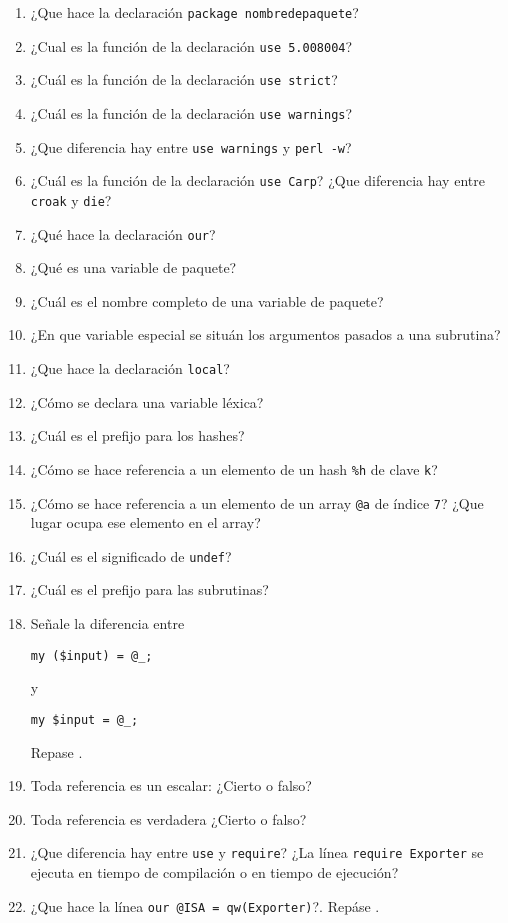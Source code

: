\label{repaso:fases}
\begin{enumerate}
\item
¿Que hace la declaración 
\verb|package nombredepaquete|?
\item
¿Cual es la función de la declaración \verb|use 5.008004|?
\item
¿Cuál es la función de la declaración \verb|use strict|?
\item
¿Cuál es la función de la declaración \verb|use warnings|?
\item
¿Que diferencia hay entre \verb|use warnings| y \verb|perl -w|?
\item
¿Cuál es la función de la declaración \verb|use Carp|?
¿Que diferencia hay entre \verb|croak| y \verb|die|?
\item
¿Qué hace la declaración \verb|our|? 
\item
¿Qué es una variable de paquete?
\item
¿Cuál es el nombre completo de una variable de paquete?
\item
¿En que variable especial se situán los argumentos pasados a una subrutina?
\item
¿Que hace la declaración \verb|local|?
\item
¿Cómo se declara una variable léxica?
\item
¿Cuál es el prefijo para los hashes?
\item
¿Cómo se hace referencia a un elemento de un hash \verb|%h| de clave \verb|k|?
\item
¿Cómo se hace referencia a un elemento de un array \verb|@a| de índice \verb|7|?
¿Que lugar ocupa ese elemento en el array?
\item
¿Cuál es el significado de \verb|undef|?
\item
¿Cuál es el prefijo para las subrutinas?
\item
Señale la diferencia entre
\begin{verbatim}
my ($input) = @_;
\end{verbatim}
y
\begin{verbatim}
my $input = @_;
\end{verbatim}
Repase 
.
\item
Toda referencia es un escalar: ¿Cierto o falso?
\item
Toda referencia es verdadera ¿Cierto o falso?
\item
¿Que diferencia hay entre \verb|use| y \verb|require|?
¿La línea \verb|require Exporter| se ejecuta en tiempo de compilación 
o en tiempo de ejecución?
\item
¿Que hace la línea 
\verb|our @ISA = qw(Exporter)|?. Repáse 
.


\end{enumerate}
